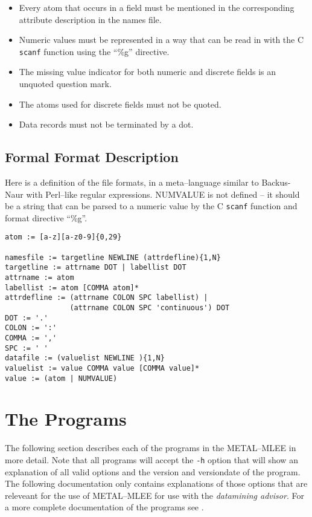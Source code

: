 \documentclass[a4paper,10pt,twoside]{article}
\newcommand{\eenameshort}{\textsf{METAL--MLEE}}
\begin{document}
\begin{itemize}
\item Every atom that occurs in a field must be mentioned in the
corresponding attribute description in the names file.
\item Numeric values must be represented in a way that can be
read in with the C \texttt{scanf} function using the ``\%g'' directive.
\item The missing value indicator for both numeric and discrete 
fields is an unquoted question mark.
\item The atoms used for discrete fields must not be quoted.
\item Data records must not be terminated by a dot.
\end{itemize}

\subsection{Formal Format Description}

Here is a definition of the file formats,
in a meta--language similar to Backus-Naur with
Perl--like regular expressions. NUMVALUE is not
defined -- it should be a string that can be 
parsed to a numeric value by the C \texttt{scanf} 
function and format directive ``\%g''. 

\begin{verbatim}
atom := [a-z][a-z0-9]{0,29}

namesfile := targetline NEWLINE (attrdefline){1,N}
targetline := attrname DOT | labellist DOT
attrname := atom
labellist := atom [COMMA atom]*
attrdefline := (attrname COLON SPC labellist) |
               (attrname COLON SPC 'continuous') DOT 
DOT := '.'
COLON := ':'
COMMA := ','
SPC := ' '
datafile := (valuelist NEWLINE ){1,N}
valuelist := value COMMA value [COMMA value]*
value := (atom | NUMVALUE)
\end{verbatim}





\section{The Programs}
\label{programs}

The following section describes each of the programs in the
\eenameshort{} in more detail. Note that all programs will
accept the \texttt{-h} option that will show an explanation
of all valid options and the version and versiondate of 
the program. The following documentation only contains 
explanations of those options that are releveant for the
use of \eenameshort{} for use with the \emph{datamining advisor}.
For a more complete documentation of the programs see
\cite{Petrak:2002a}.
\end{document}
